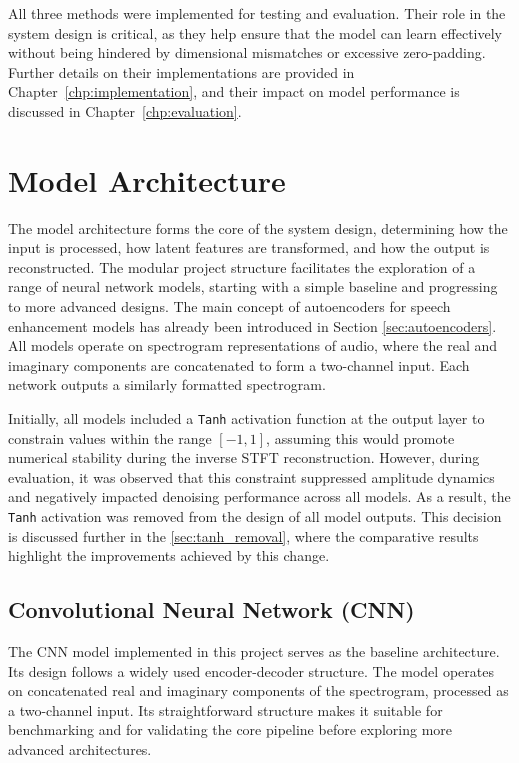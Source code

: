 All three methods were implemented for testing and evaluation. Their role in the system design is critical, as they help ensure that the model can learn effectively without being hindered by dimensional mismatches or excessive zero-padding. Further details on their implementations are provided in Chapter~\ref{chp:implementation}, and their impact on model performance is discussed in Chapter~\ref{chp:evaluation}.

\section{Model Architecture}
\label{sec:model_architecture}

The model architecture forms the core of the system design, determining how the input is processed, how latent features are transformed, and how the output is reconstructed. The modular project structure facilitates the exploration of a range of neural network models, starting with a simple baseline and progressing to more advanced designs. The main concept of autoencoders for speech enhancement models has already been introduced in Section \ref{sec:autoencoders}. All models operate on spectrogram representations of audio, where the real and imaginary components are concatenated to form a two-channel input. Each network outputs a similarly formatted spectrogram.

Initially, all models included a \texttt{Tanh} activation function at the output layer to constrain values within the range \([-1, 1]\), assuming this would promote numerical stability during the inverse STFT reconstruction. However, during evaluation, it was observed that this constraint suppressed amplitude dynamics and negatively impacted denoising performance across all models. As a result, the \texttt{Tanh} activation was removed from the design of all model outputs. This decision is discussed further in the \ref{sec:tanh_removal}, where the comparative results highlight the improvements achieved by this change.

\subsection{Convolutional Neural Network (CNN)}
\label{sec:cnn}

The CNN model implemented in this project serves as the baseline architecture. Its design follows a widely used encoder-decoder structure. The model operates on concatenated real and imaginary components of the spectrogram, processed as a two-channel input. Its straightforward structure makes it suitable for benchmarking and for validating the core pipeline before exploring more advanced architectures.

